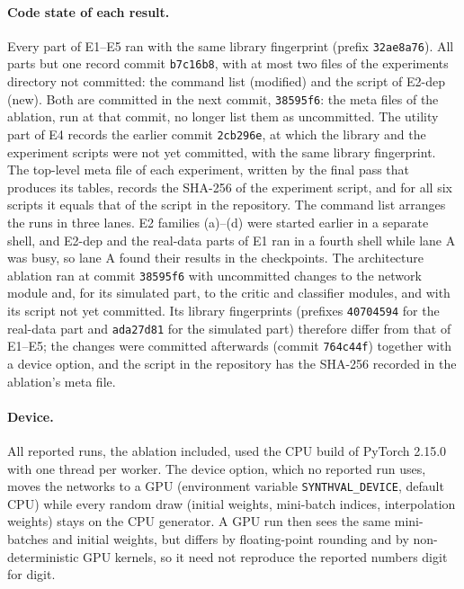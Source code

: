 \paragraph{Code state of each result.}
Every part of E1--E5 ran with the same library fingerprint (prefix \texttt{32ae8a76}). All parts
but one record commit \texttt{b7c16b8}, with at most two files of the experiments directory not
committed: the command list (modified) and the script of E2-dep (new). Both are committed in the
next commit, \texttt{38595f6}: the meta files of the ablation, run at that commit, no longer list
them as uncommitted.
The utility part of E4 records the earlier commit \texttt{2cb296e}, at which the library and the
experiment scripts were not yet committed, with the same library fingerprint. The top-level meta
file of each experiment, written by the final pass that produces its tables, records the SHA-256
of the experiment script, and for all six scripts it equals that of the script in the
repository. The command list arranges the runs in three lanes. E2 families (a)--(d) were started
earlier in a separate shell, and E2-dep and the real-data parts of E1 ran in a fourth shell while
lane A was busy, so lane A found their results in the checkpoints. The architecture ablation ran
at commit \texttt{38595f6} with uncommitted changes to the network module and, for its simulated
part, to the critic and classifier modules, and with its script not yet committed. Its library
fingerprints (prefixes \texttt{40704594} for the real-data part and \texttt{ada27d81} for the
simulated part) therefore differ from that of E1--E5; the changes were committed afterwards
(commit \texttt{764c44f}) together with a device option, and the script in the repository has
the SHA-256 recorded in the ablation's meta file.

\paragraph{Device.}
All reported runs, the ablation included, used the CPU build of PyTorch 2.15.0 with one thread
per worker. The device option, which no reported run uses, moves the networks to a GPU
(environment variable \texttt{SYNTHVAL\_DEVICE}, default CPU) while every random draw (initial
weights, mini-batch indices, interpolation weights) stays on the CPU generator. A GPU run then
sees the same mini-batches and initial weights, but differs by floating-point rounding and by
non-deterministic GPU kernels, so it need not reproduce the reported numbers digit for digit.

